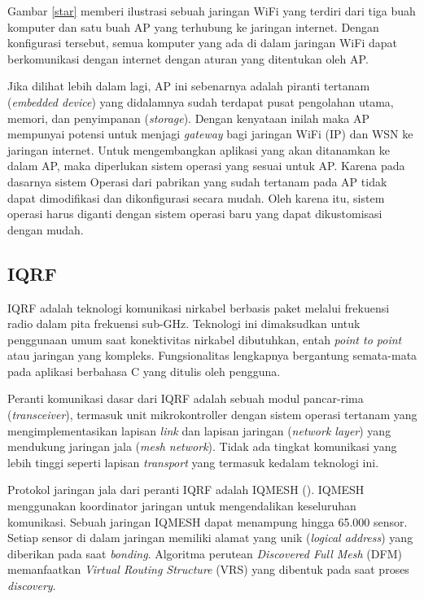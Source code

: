     Gambar \ref{star} memberi ilustrasi sebuah jaringan WiFi yang terdiri dari tiga buah komputer dan satu buah AP yang terhubung ke jaringan internet. Dengan konfigurasi tersebut, semua komputer yang ada di dalam jaringan WiFi dapat berkomunikasi dengan internet dengan aturan yang ditentukan oleh AP.

    Jika dilihat lebih dalam lagi, AP ini sebenarnya adalah piranti tertanam (\emph{embedded device}) yang didalamnya sudah terdapat pusat pengolahan utama, memori, dan penyimpanan (\emph{storage}). Dengan kenyataan inilah maka AP mempunyai potensi untuk menjagi \emph{gateway} bagi jaringan WiFi (IP) dan WSN ke jaringan internet. Untuk mengembangkan aplikasi yang akan ditanamkan ke dalam AP, maka diperlukan sistem operasi yang sesuai untuk AP. Karena pada dasarnya sistem Operasi dari pabrikan yang sudah tertanam pada AP tidak dapat dimodifikasi dan dikonfigurasi secara mudah. Oleh karena itu, sistem operasi harus diganti dengan sistem operasi baru yang dapat dikustomisasi dengan mudah.

  \subsection{IQRF}
    IQRF adalah teknologi komunikasi nirkabel berbasis paket melalui frekuensi radio dalam pita frekuensi sub-GHz. Teknologi ini dimaksudkan untuk penggunaan umum saat konektivitas nirkabel dibutuhkan, entah \emph{point to point} atau jaringan yang kompleks. Fungsionalitas lengkapnya bergantung semata-mata pada aplikasi berbahasa C yang ditulis oleh pengguna.

    Peranti komunikasi dasar dari IQRF adalah sebuah modul pancar-rima (\emph{transceiver}), termasuk unit mikrokontroller dengan sistem operasi tertanam yang mengimplementasikan lapisan \emph{link} dan lapisan jaringan (\emph{network layer}) yang mendukung jaringan jala (\emph{mesh network}). Tidak ada tingkat komunikasi yang lebih tinggi seperti lapisan \emph{transport} yang termasuk kedalam teknologi ini.

    Protokol jaringan jala dari peranti IQRF adalah IQMESH (\cite{Seflova2012}). IQMESH menggunakan koordinator jaringan untuk mengendalikan keseluruhan komunikasi. Sebuah jaringan IQMESH dapat menampung hingga 65.000 sensor. Setiap sensor di dalam jaringan memiliki alamat yang unik (\emph{logical address}) yang diberikan pada saat \emph{bonding}. Algoritma perutean \emph{Discovered Full Mesh} (DFM) memanfaatkan \emph{Virtual Routing Structure} (VRS) yang dibentuk pada saat proses \emph{discovery}.

